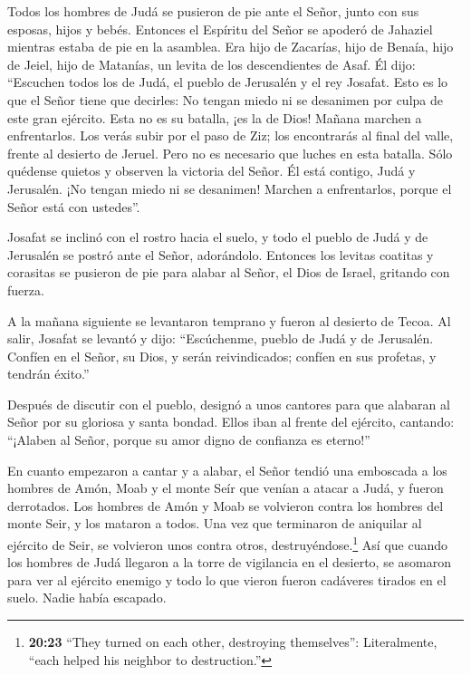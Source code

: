  Todos los hombres de Judá se pusieron de pie ante el
Señor, junto con sus esposas, hijos y bebés.  Entonces el
Espíritu del Señor se apoderó de Jahaziel mientras estaba de pie en la
asamblea. Era hijo de Zacarías, hijo de Benaía, hijo de Jeiel, hijo de
Matanías, un levita de los descendientes de Asaf.  Él dijo:
``Escuchen todos los de Judá, el pueblo de Jerusalén y el rey Josafat.
Esto es lo que el Señor tiene que decirles: No tengan miedo ni se
desanimen por culpa de este gran ejército. Esta no es su batalla, ¡es la
de Dios!  Mañana marchen a enfrentarlos. Los verás subir
por el paso de Ziz; los encontrarás al final del valle, frente al
desierto de Jeruel.  Pero no es necesario que luches en
esta batalla. Sólo quédense quietos y observen la victoria del Señor. Él
está contigo, Judá y Jerusalén. ¡No tengan miedo ni se desanimen!
Marchen a enfrentarlos, porque el Señor está con ustedes''.

 Josafat se inclinó con el rostro hacia el suelo, y todo el
pueblo de Judá y de Jerusalén se postró ante el Señor, adorándolo.
 Entonces los levitas coatitas y corasitas se pusieron de
pie para alabar al Señor, el Dios de Israel, gritando con fuerza.

 A la mañana siguiente se levantaron temprano y fueron al
desierto de Tecoa. Al salir, Josafat se levantó y dijo: ``Escúchenme,
pueblo de Judá y de Jerusalén. Confíen en el Señor, su Dios, y serán
reivindicados; confíen en sus profetas, y tendrán éxito.''

 Después de discutir con el pueblo, designó a unos cantores
para que alabaran al Señor por su gloriosa y santa bondad. Ellos iban al
frente del ejército, cantando: ``¡Alaben al Señor, porque su amor digno
de confianza es eterno!''

 En cuanto empezaron a cantar y a alabar, el Señor tendió
una emboscada a los hombres de Amón, Moab y el monte Seír que venían a
atacar a Judá, y fueron derrotados.  Los hombres de Amón y
Moab se volvieron contra los hombres del monte Seir, y los mataron a
todos. Una vez que terminaron de aniquilar al ejército de Seir, se
volvieron unos contra otros, destruyéndose.\footnote{\textbf{20:23}
  ``They turned on each other, destroying themselves'': Literalmente,
  ``each helped his neighbor to destruction.''}  Así que
cuando los hombres de Judá llegaron a la torre de vigilancia en el
desierto, se asomaron para ver al ejército enemigo y todo lo que vieron
fueron cadáveres tirados en el suelo. Nadie había escapado.

